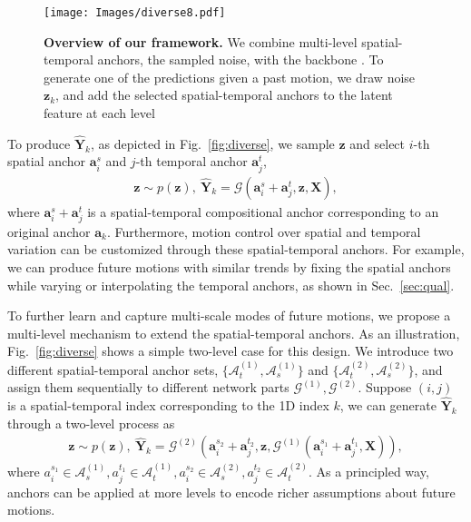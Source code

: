 \begin{figure}[t]
\centering
\texttt{[image: Images/diverse8.pdf]}
\caption{\textbf{Overview of our \ours{} framework.} We combine multi-level spatial-temporal anchors, the sampled noise, with the backbone \oursmodel. To generate one of the predictions given a past motion, we draw noise $\mathbf z_k$, and add the selected spatial-temporal anchors to the latent feature at each level}
\label{fig:deterministic2}
\end{figure}

To produce $\mathbf{\widehat{Y}}_k$, as depicted in Fig.~\ref{fig:diverse}{\color{red}{(c)}}, we sample $\mathbf z$ and select $i$-th spatial anchor $\mathbf a_i^s$ and $j$-th temporal anchor $\mathbf a_j^t$, 
\begin{align}
    \mathbf{z} \sim p(\mathbf z),\ \mathbf{\widehat{Y}}_k = \mathcal{G}(\mathbf a_i^s + \mathbf a_j^t, \mathbf{z}, \mathbf{X}),
\end{align}
where $\mathbf a_i^s + \mathbf a_j^t$ is a spatial-temporal compositional anchor corresponding to an original anchor $\mathbf a_k$. Furthermore, motion control over spatial and temporal variation can be customized through these spatial-temporal anchors. For example, we can produce future motions with similar trends by fixing the spatial anchors while varying or interpolating the temporal anchors, as shown in Sec.~\ref{sec:qual}. 

To further learn and capture multi-scale modes of future motions, we propose a multi-level mechanism to extend the spatial-temporal anchors.
As an illustration, Fig.~\ref{fig:diverse}{\color{red}{(d)}} shows a simple two-level case for this design. We introduce two different spatial-temporal anchor sets, $\{\mathcal{A}_t^{(1)},\mathcal{A}_s^{(1)}\}$ and $\{\mathcal{A}_t^{(2)},\mathcal{A}_s^{(2)}\}$, and assign them sequentially to different network parts $\mathcal{G}^{(1)},\mathcal{G}^{(2)}$. Suppose $(i, j)$ is a spatial-temporal index corresponding to the 1D index $k$, we can generate $\mathbf{\widehat{Y}}_k$ through a two-level process as
\begin{align}
    \mathbf{z} \sim p(\mathbf z),\ \mathbf{\widehat{Y}}_k = \mathcal{G}^{(2)}(\mathbf a_i^{s_{2}} + \mathbf a_j^{t_{2}}, \mathbf{z}, \mathcal{G}^{(1)}(\mathbf a_i^{s_{1}} + \mathbf a_j^{t_{1}}, \mathbf{X})),
\end{align}
where $a_i^{s_{1}} \in \mathcal{A}_s^{(1)}, a_j^{t_{1}} \in \mathcal{A}_t^{(1)}, a_i^{s_{2}} \in \mathcal{A}_s^{(2)}, a_j^{t_{2}} \in \mathcal{A}_t^{(2)}$. As a principled way, anchors can be applied at more levels to encode richer assumptions about future motions.
 
